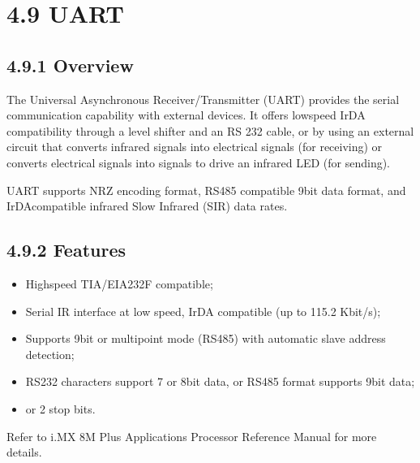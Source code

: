 \documentclass[letterpaper,10pt,openany,english]{sphinxmanual}
\begin{document}
\section{4.9 UART}
\label{\detokenize{hardware:uart}}

\subsection{4.9.1 Overview}
\label{\detokenize{hardware:id12}}
\sphinxAtStartPar
The Universal Asynchronous Receiver/Transmitter (UART) provides the serial communication capability with external devices. It offers low\sphinxhyphen{}speed IrDA compatibility through a level shifter and an RS \sphinxhyphen{} 232 cable, or by using an external circuit that converts infrared signals into electrical signals (for receiving) or converts electrical signals into signals to drive an infrared LED (for sending).

\sphinxAtStartPar
UART supports NRZ encoding format, RS485 compatible 9\sphinxhyphen{}bit data format, and IrDA\sphinxhyphen{}compatible infrared Slow Infrared (SIR) data rates.


\subsection{4.9.2 Features}
\label{\detokenize{hardware:id13}}\begin{itemize}
\item {} 
\sphinxAtStartPar
High\sphinxhyphen{}speed TIA/EIA\sphinxhyphen{}232\sphinxhyphen{}F compatible;

\item {} 
\sphinxAtStartPar
Serial IR interface at low speed, IrDA compatible (up to 115.2 Kbit/s);

\item {} 
\sphinxAtStartPar
Supports 9\sphinxhyphen{}bit or multi\sphinxhyphen{}point mode (RS\sphinxhyphen{}485) with automatic slave address detection;

\item {} 
\sphinxAtStartPar
RS\sphinxhyphen{}232 characters support 7 or 8\sphinxhyphen{}bit data, or RS\sphinxhyphen{}485 format supports 9\sphinxhyphen{}bit data;

\item {} 
 or 2 stop bits.

\end{itemize}

\sphinxAtStartPar
Refer to  i.MX 8M Plus Applications Processor Reference Manual for more details.
\end{document}
